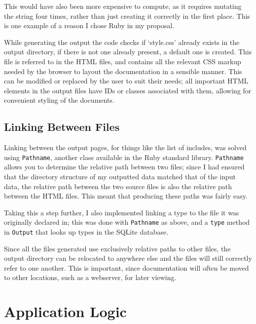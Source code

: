 This would have also been more expensive to compute, as it requires mutating the
string four times, rather than just creating it correctly in the first place.
This is one example of a reason I chose Ruby in my proposal.

While generating the output the code checks if `style.css' already exists in the
output directory, if there is not one already present, a default one is created.
This file is referred to in the HTML files, and contains all the relevant CSS
markup needed by the browser to layout the documentation in a sensible manner.
This can be modified or replaced by the user to suit their needs; all important
HTML elements in the output files have IDs or classes associated with them,
allowing for convenient styling of the documents.

\noindent{}

  \subsection{Linking Between Files}
    Linking between the output pages, for things like the list of includes, was
    solved using \lstinline|Pathname|, another class available in the Ruby
    standard library. \lstinline|Pathname| allows you to determine the relative
    path between two files; since I had ensured that the directory structure of
    my outputted data matched that of the input data, the relative path between
    the two source files is also the relative path between the HTML files. This
    meant that producing these paths was fairly easy.

    Taking this a step further, I also implemented linking a type to the file it
    was originally declared in; this was done with \lstinline|Pathname| as
    above, and a \lstinline|type| method in \lstinline|Output| that looks up
    types in the SQLite database.

    Since all the files generated use exclusively relative paths to other files,
    the output directory can be relocated to anywhere else and the files will
    still correctly refer to one another. This is important, since documentation
    will often be moved to other locations, such as a webserver, for later
    viewing.

\section{Application Logic}

